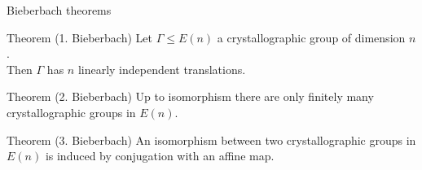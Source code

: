 \documentclass{beamer}
\numberwithin{equation}{aufgabe}
\begin{document}
\begin{frame}{Bieberbach theorems}
    \begin{block}{Theorem (1. Bieberbach) \cite[Satz 1.3]{plesken2014}}
        Let $\Gamma \leq E(n)$ a crystallographic group of dimension $n$. \\ \pause
        Then $\Gamma$ has $n$ linearly independent translations.
    \end{block}
    \pause
    \begin{block}{Theorem (2. Bieberbach) \cite[Satz 1.5]{plesken2014}}
        Up to isomorphism there are only finitely many crystallographic groups in $E(n)$.
    \end{block}
    \pause 
    \begin{block}{Theorem (3. Bieberbach) \cite[Satz 1.6]{plesken2014}}
        An isomorphism between two crystallographic groups in $E(n)$ is induced by conjugation with an affine map.
    \end{block}
\end{frame}
\end{document}
